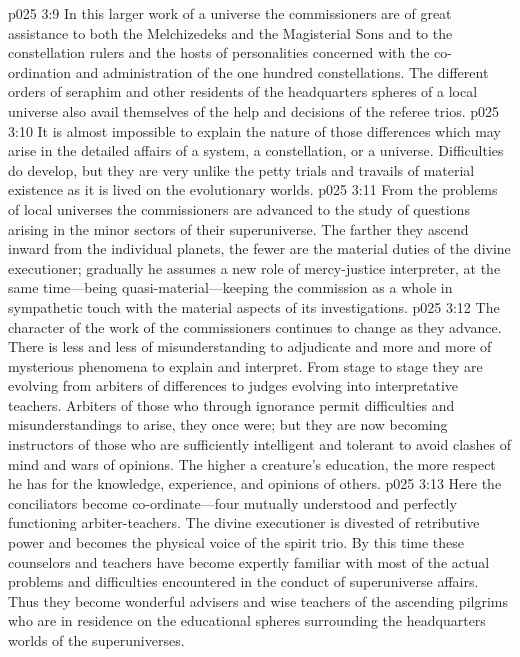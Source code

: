 \pc \vs p025 3:9 \bibnobreakspace {} In this larger work of a universe the commissioners are of great assistance to both the Melchizedeks and the Magisterial Sons and to the constellation rulers and the hosts of personalities concerned with the co\hyp{}ordination and administration of the one hundred constellations. The different orders of seraphim and other residents of the headquarters spheres of a local universe also avail themselves of the help and decisions of the referee trios.
\vs p025 3:10 It is almost impossible to explain the nature of those differences which may arise in the detailed affairs of a system, a constellation, or a universe. Difficulties do develop, but they are very unlike the petty trials and travails of material existence as it is lived on the evolutionary worlds.
\pc \vs p025 3:11 \bibnobreakspace {} From the problems of local universes the commissioners are advanced to the study of questions arising in the minor sectors of their superuniverse. The farther they ascend inward from the individual planets, the fewer are the material duties of the divine executioner; gradually he assumes a new role of mercy\hyp{}justice interpreter, at the same time---being quasi\hyp{}material---keeping the commission as a whole in sympathetic touch with the material aspects of its investigations.
\pc \vs p025 3:12 \bibnobreakspace {} The character of the work of the commissioners continues to change as they advance. There is less and less of misunderstanding to adjudicate and more and more of mysterious phenomena to explain and interpret. From stage to stage they are evolving from arbiters of differences to judges evolving into interpretative teachers. Arbiters of those who through ignorance permit difficulties and misunderstandings to arise, they once were; but they are now becoming instructors of those who are sufficiently intelligent and tolerant to avoid clashes of mind and wars of opinions. The higher a creature’s education, the more respect he has for the knowledge, experience, and opinions of others.
\pc \vs p025 3:13 \bibnobreakspace {} Here the conciliators become co\hyp{}ordinate---four mutually understood and perfectly functioning arbiter\hyp{}teachers. The divine executioner is divested of retributive power and becomes the physical voice of the spirit trio. By this time these counselors and teachers have become expertly familiar with most of the actual problems and difficulties encountered in the conduct of superuniverse affairs. Thus they become wonderful advisers and wise teachers of the ascending pilgrims who are in residence on the educational spheres surrounding the headquarters worlds of the superuniverses.

